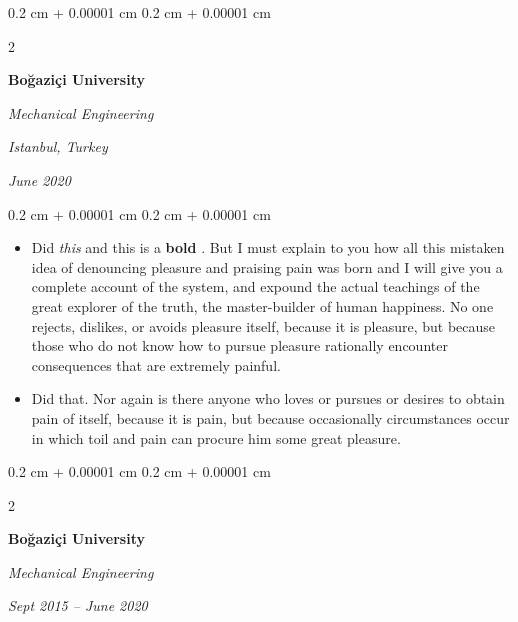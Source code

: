 \documentclass[10pt, letterpaper]{article}
\newenvironment{highlights}{
    \begin{itemize}[
        topsep=0.10 cm,
        parsep=0.10 cm,
        partopsep=0pt,
        itemsep=0pt,
        leftmargin=0.4 cm + 10pt
    ]
}{
    \end{itemize}
} %
\newenvironment{onecolentry}{
    \begin{adjustwidth}{
        0.2 cm + 0.00001 cm
    }{
        0.2 cm + 0.00001 cm
    }
}{
    \end{adjustwidth}
} %
\newenvironment{twocolentry}[2][]{
    \onecolentry
    \def\secondColumn{#2}
    \setcolumnwidth{\fill, 4.5 cm}
    \begin{paracol}{2}
}{
    \switchcolumn \raggedleft \secondColumn
    \end{paracol}
    \endonecolentry
} %
\let\hrefWithoutArrow\href
\renewcommand{\href}[2]{\hrefWithoutArrow{#1}{\ifthenelse{\equal{#2}{}}{ }{#2 }\raisebox{.15ex}{\footnotesize \faExternalLink*}}}
\begin{document}
        \vspace{0.2 cm}

        \begin{twocolentry}{
        \textit{Istanbul, Turkey}    
            
        \textit{June 2020}}
            \textbf{Boğaziçi University}

            \textit{Mechanical Engineering}
        \end{twocolentry}

        \vspace{0.10 cm}
        \begin{onecolentry}
            \begin{highlights}
                \item Did \textit{this} and this is a \textbf{bold} \href{https://example.com}{link}. But I must explain to you how all this mistaken idea of denouncing pleasure and praising pain was born and I will give you a complete account of the system, and expound the actual teachings of the great explorer of the truth, the master-builder of human happiness. No one rejects, dislikes, or avoids pleasure itself, because it is pleasure, but because those who do not know how to pursue pleasure rationally encounter consequences that are extremely painful.
                \item Did that. Nor again is there anyone who loves or pursues or desires to obtain pain of itself, because it is pain, but because occasionally circumstances occur in which toil and pain can procure him some great pleasure.
            \end{highlights}
        \end{onecolentry}


        \vspace{0.2 cm}

        \begin{twocolentry}{
            
            
        \textit{Sept 2015 – June 2020}}
            \textbf{Boğaziçi University}

            \textit{Mechanical Engineering}
        \end{twocolentry}
\end{document}
